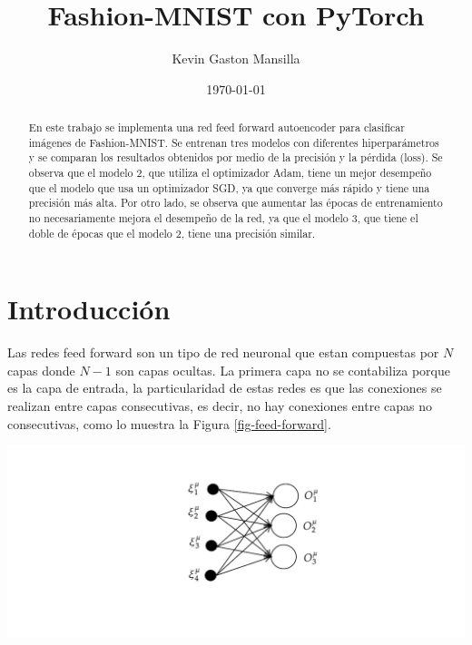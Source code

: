 \documentclass[aps,prl,reprint,groupedaddress]{revtex4-2}
\newenvironment{Figura}
  {\par\medskip\noindent\minipage{\linewidth}}
  {\endminipage\par\medskip}
\begin{document}
\title{
Fashion-MNIST con PyTorch
}

\author{Kevin Gaston Mansilla}

\affiliation{}

\date{\today}

\begin{abstract}
En este trabajo se implementa una red feed forward autoencoder para clasificar
imágenes de Fashion-MNIST. Se entrenan tres modelos con diferentes hiperparámetros
y se comparan los resultados obtenidos por medio de la precisión y la 
pérdida (loss). Se observa que el modelo 2, que utiliza el optimizador Adam, 
tiene un mejor desempeño que el modelo que usa un optimizador SGD, ya que
converge más rápido y tiene una precisión más alta. Por otro lado, se observa que
aumentar las épocas de entrenamiento no necesariamente mejora el desempeño de la
red, ya que el modelo 3, que tiene el doble de épocas que el modelo 2, tiene una
precisión similar.
\end{abstract}


\maketitle

\section{Introducción}
Las redes feed forward son un tipo de red neuronal que estan compuestas por 
$N$ capas donde $N-1$ son capas ocultas. La primera capa no se contabiliza 
porque es la capa de entrada, la particularidad de estas redes es que las 
conexiones se realizan entre capas consecutivas, es decir, no hay conexiones
entre capas no consecutivas, como lo muestra la Figura \ref{fig-feed-forward}.
\begin{Figura}
  \centering
  \includegraphics[width=1\textwidth]{figs/red-feed-forward.pdf}
  \label{fig-feed-forward}
\end{Figura}
\end{document}
